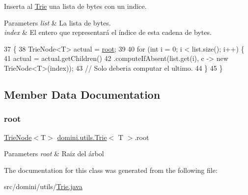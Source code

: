 Inserta al \hyperlink{classdomini_1_1utils_1_1Trie}{Trie} una lista de bytes con un indice. 


\begin{DoxyParams}{Parameters}
{\em list} & La lista de bytes. \\
\hline
{\em index} & El entero que representará el índice de esta cadena de bytes. \\
\hline
\end{DoxyParams}

\begin{DoxyCode}
37                                                          \{
38         TrieNode<T> actual = \hyperlink{classdomini_1_1utils_1_1Trie_a60ef63a6c55d07710d33892ccc899bce}{root};
39 
40         \textcolor{keywordflow}{for} (\textcolor{keywordtype}{int} i = 0; i < list.size(); i++) \{
41             actual = actual.getChildren()
42                 .computeIfAbsent(list.get(i), c -> \textcolor{keyword}{new} TrieNode<T>(index)); 
43                 \textcolor{comment}{// Solo deberia computar el ultimo.}
44         \}
45     \}
\end{DoxyCode}


\subsection{Member Data Documentation}
\mbox{\label{classdomini_1_1utils_1_1Trie_a60ef63a6c55d07710d33892ccc899bce}} 
\subsubsection{\texorpdfstring{root}{root}}
{\footnotesize\ttfamily \hyperlink{classdomini_1_1utils_1_1TrieNode}{Trie\+Node}$<$T$>$ \hyperlink{classdomini_1_1utils_1_1Trie}{domini.\+utils.\+Trie}$<$ T $>$.root\hspace{0.3cm}{\ttfamily [private]}}


\begin{DoxyParams}{Parameters}
{\em root} & Raiz del árbol \\
\hline
\end{DoxyParams}


The documentation for this class was generated from the following file\+:\begin{DoxyCompactItemize}
\item 
src/domini/utils/\hyperlink{Trie_8java}{Trie.\+java}\end{DoxyCompactItemize}
